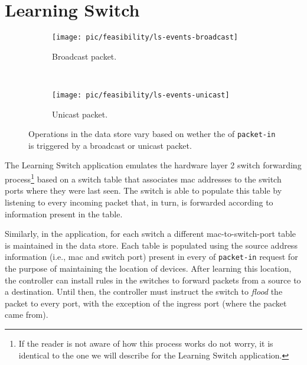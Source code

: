 \section{Learning Switch} 
\label{sec:feasibility:ls}
\glsresetall
\begin{figure}[ht]
  \begin{subfigure}[b]{0.5\textwidth}
                \centering
                \texttt{[image: pic/feasibility/ls-events-broadcast]}
                \caption{Broadcast packet.}
                \label{fig:ls:interaction:broadcast}
        \end{subfigure}%
        ~
        \begin{subfigure}[b]{0.5\textwidth}
                \centering
                \texttt{[image: pic/feasibility/ls-events-unicast]}
                \caption{Unicast packet.}
                \label{fig:ls:interaction:unicast}
        \end{subfigure}
        \caption[Learning Switch workloads]{Operations in the data store vary based on wether the \gls{of} \texttt{packet-in} is triggered by a broadcast or unicast packet.}
        \label{fig:ls:interaction}
\end{figure}

The Learning Switch application emulates the hardware layer 2 switch forwarding process\footnote{If the reader is not aware of how this process works do not worry, it is identical to the one we will describe for the Learning Switch application.} based on a switch table that associates \gls{mac} addresses to the switch ports where they were last seen. 
The switch is able to populate this table by listening to every incoming packet that, in turn, is forwarded according to information present in the table. 

Similarly, in the application, for each switch a different \gls{mac}-to-switch-port table is maintained in the data store. 
Each table is populated using the source address information (i.e., \gls{mac} and switch port)  present in every \gls{of}  \texttt{packet-in} request for the purpose of maintaining the location of devices. 
After learning this location, the controller can install rules in the switches to forward packets from a source to  a destination. 
Until then, the controller must instruct the switch to \emph{flood} the packet to every port, with the exception of the ingress port (where the packet came from).


